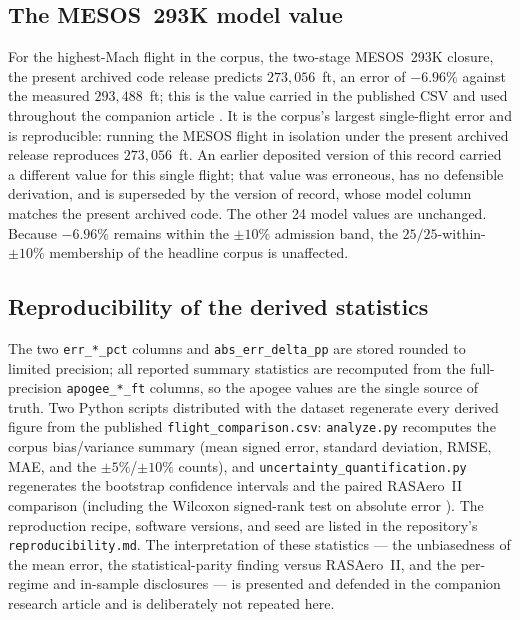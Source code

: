 \subsection{The MESOS~293K model value}

For the highest-Mach flight in the corpus, the two-stage MESOS~293K closure, the
present archived code release predicts $273{,}056$~ft, an error of $-6.96\%$
against the measured $293{,}488$~ft; this is the value carried in the published
CSV and used throughout the companion article \cite{yu2026jsr}. It is the
corpus's largest single-flight error and is reproducible: running the MESOS
flight in isolation under the present archived release reproduces $273{,}056$~ft.
An earlier deposited version of this record carried a different value for
this single flight; that value was erroneous, has no defensible derivation, and is
superseded by the version of record, whose model column matches the present
archived code. The other 24 model values are unchanged. Because $-6.96\%$ remains
within the $\pm 10\%$ admission band, the $25/25$-within-$\pm 10\%$ membership of
the headline corpus is unaffected.

\subsection{Reproducibility of the derived statistics}

The two \texttt{err\_*\_pct} columns and \texttt{abs\_err\_delta\_pp} are stored
rounded to limited precision; all reported summary statistics are recomputed from
the full-precision \texttt{apogee\_*\_ft} columns, so the apogee values are the
single source of truth. Two Python scripts distributed with the dataset regenerate
every derived figure from the published \texttt{flight\_comparison.csv}:
\texttt{analyze.py} recomputes the corpus bias/variance summary (mean signed error,
standard deviation, RMSE, MAE, and the $\pm 5\%$/$\pm 10\%$ counts), and
\texttt{uncertainty\_quantification.py} regenerates the bootstrap confidence
intervals and the paired RASAero~II comparison (including the Wilcoxon signed-rank
test on absolute error \cite{wilcoxon1945}). The reproduction recipe, software
versions, and seed are listed in the repository's \texttt{reproducibility.md}. The
interpretation of these statistics --- the unbiasedness of the mean error, the
statistical-parity finding versus RASAero~II, and the per-regime and in-sample
disclosures --- is presented and defended in the companion research article
\cite{yu2026jsr} and is deliberately not repeated here.
